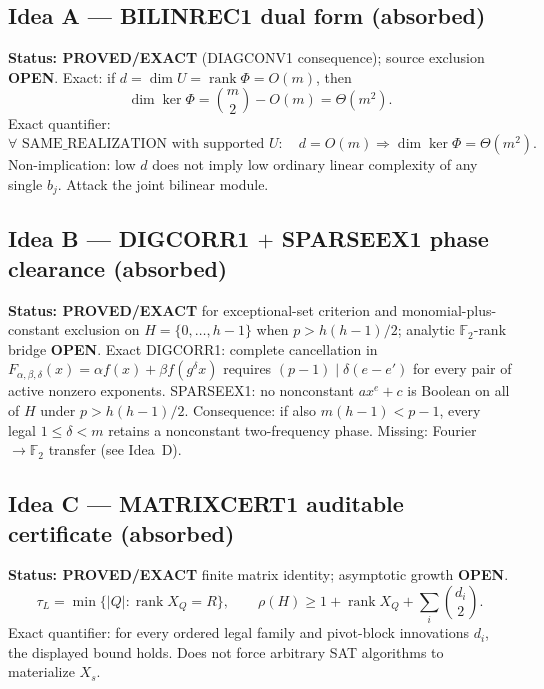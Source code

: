 \documentclass[11pt]{article}
\begin{document}
\subsection*{Idea A --- BILINREC1 dual form (absorbed)}
\textbf{Status: PROVED/EXACT} (DIAGCONV1 consequence); source exclusion \textbf{OPEN}.
Exact: if $d=\dim U=\operatorname{rank}\Phi=O(m)$, then
\[
\dim\ker\Phi=\binom{m}{2}-O(m)=\Theta(m^2).
\]
Exact quantifier:
\[
\forall\text{ SAME\_REALIZATION with supported }U:\quad
d=O(m)\Longrightarrow\dim\ker\Phi=\Theta(m^2).
\]
Non-implication: low $d$ does not imply low ordinary linear complexity of any single
$b_j$. Attack the joint bilinear module.

\subsection*{Idea B --- DIGCORR1 $+$ SPARSEEX1 phase clearance (absorbed)}
\textbf{Status: PROVED/EXACT} for exceptional-set criterion and monomial-plus-constant
exclusion on $H=\{0,\ldots,h-1\}$ when $p>h(h-1)/2$; analytic $\mathbb F_2$-rank bridge
\textbf{OPEN}.
Exact DIGCORR1: complete cancellation in $F_{\alpha,\beta,\delta}(x)=\alpha f(x)+\beta f(g^\delta x)$
requires $(p-1)\mid\delta(e-e')$ for every pair of active nonzero exponents.
SPARSEEX1: no nonconstant $ax^e+c$ is Boolean on all of $H$ under $p>h(h-1)/2$.
Consequence: if also $m(h-1)<p-1$, every legal $1\le\delta<m$ retains a nonconstant
two-frequency phase. Missing: Fourier$\to\mathbb F_2$ transfer (see Idea~D).

\subsection*{Idea C --- MATRIXCERT1 auditable certificate (absorbed)}
\textbf{Status: PROVED/EXACT} finite matrix identity; asymptotic growth \textbf{OPEN}.
\[
\tau_L=\min\{|Q|:\operatorname{rank}X_Q=R\},\qquad
\rho(H)\ge 1+\operatorname{rank}X_Q+\sum_i\binom{d_i}{2}.
\]
Exact quantifier: for every ordered legal family and pivot-block innovations $d_i$,
the displayed bound holds. Does not force arbitrary SAT algorithms to materialize $X_s$.
\end{document}
